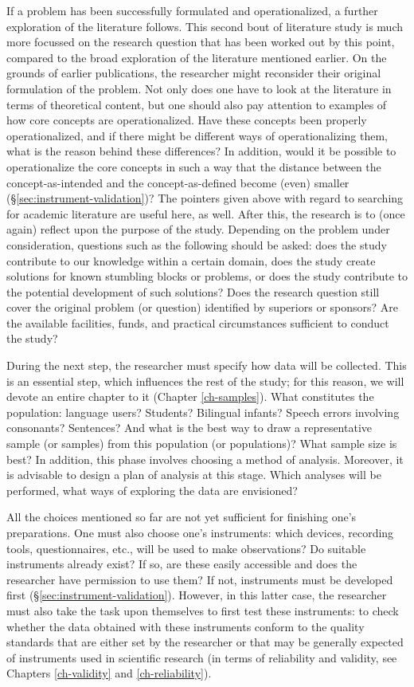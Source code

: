 \documentclass[
]{book}
\begin{document}
If a problem has been successfully formulated and operationalized, a further exploration of the literature follows. This second bout of literature study is much more focussed on the research question that has been worked out by this point, compared to the broad exploration of the literature mentioned earlier. On the grounds of earlier publications, the researcher might reconsider their original formulation of the problem. Not only does one have to look at the literature in terms of theoretical content, but one should also pay attention to examples of how core concepts are operationalized. Have these concepts been properly operationalized, and if there might be different ways of operationalizing them, what is the reason behind these differences? In addition, would it be possible to operationalize the core concepts in such a way that the distance between the concept-as-intended and the concept-as-defined become (even) smaller (§\ref{sec:instrument-validation})? The pointers given above with regard to searching for academic literature are useful here, as well. After this, the research is to (once again) reflect upon the purpose of the study. Depending on the problem under consideration, questions such as the following should be asked: does the study contribute to our knowledge within a certain domain, does the study create solutions for known stumbling blocks or problems, or does the study contribute to the potential development of such solutions? Does the research question still cover the original problem (or question) identified by superiors or sponsors? Are the available facilities, funds, and practical circumstances sufficient to conduct the study?

During the next step, the researcher must specify how data will be collected. This is an essential step, which influences the rest of the study; for this reason, we will devote an entire chapter to it (Chapter \ref{ch-samples}). What constitutes the population: language users? Students? Bilingual infants? Speech errors involving consonants? Sentences? And what is the best way to draw a representative sample (or samples) from this population (or populations)? What sample size is best? In addition, this phase involves choosing a method of analysis. Moreover, it is advisable to design a plan of analysis at this stage. Which analyses will be performed, what ways of exploring the data are envisioned?

All the choices mentioned so far are not yet sufficient for finishing one's preparations. One must also choose one's instruments: which devices, recording tools, questionnaires, etc., will be used to make observations? Do suitable instruments already exist? If so, are these easily accessible and does the researcher have permission to use them? If not, instruments must be developed first (§\ref{sec:instrument-validation}). However, in this latter case, the researcher must also take the task upon themselves to first test these instruments: to check whether the data obtained with these instruments conform to the quality standards that are either set by the researcher or that may be generally expected of instruments used in scientific research (in terms of reliability and validity, see Chapters \ref{ch-validity} and \ref{ch-reliability}).
\end{document}
